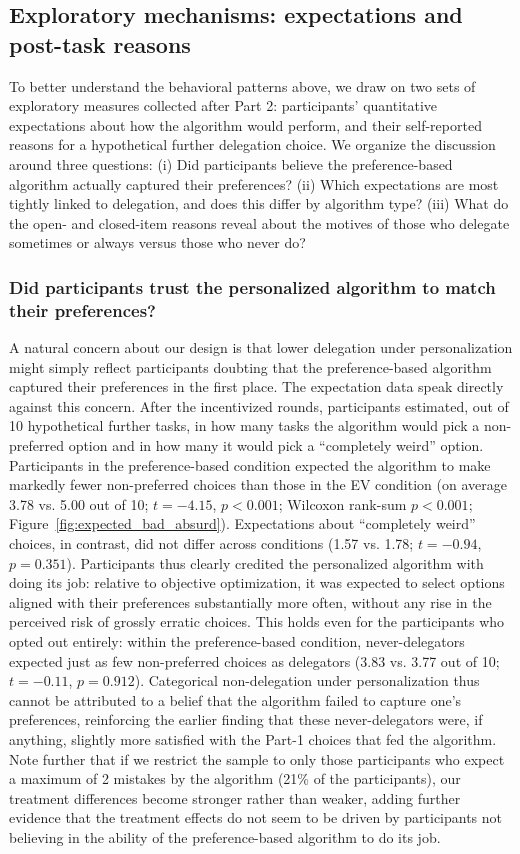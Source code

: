 \documentclass[a4paper, 12pt, fleqn]{article}
\theoremstyle{definition}
\begin{document}
\subsection{Exploratory mechanisms: expectations and post-task reasons}
\label{sec:exploratory_mechanisms}
To better understand the behavioral patterns above, we draw on two sets of exploratory measures collected after Part 2: participants' quantitative expectations about how the algorithm would perform, and their self-reported reasons for a hypothetical further delegation choice. We organize the discussion around three questions: (i) Did participants believe the preference-based algorithm actually captured their preferences? (ii) Which expectations are most tightly linked to delegation, and does this differ by algorithm type? (iii) What do the open- and closed-item reasons reveal about the motives of those who delegate sometimes or always versus those who never do?

\subsubsection*{Did participants trust the personalized algorithm to match their preferences?}
A natural concern about our design is that lower delegation under personalization might simply reflect participants doubting that the preference-based algorithm captured their preferences in the first place. The expectation data speak directly against this concern. After the incentivized rounds, participants estimated, out of 10 hypothetical further tasks, in how many tasks the algorithm would pick a non-preferred option and in how many it would pick a ``completely weird'' option. Participants in the preference-based condition expected the algorithm to make markedly fewer non-preferred choices than those in the EV condition (on average 3.78 vs. 5.00 out of 10; $t = -4.15$, $p < 0.001$; Wilcoxon rank-sum $p < 0.001$; Figure~\ref{fig:expected_bad_absurd}). Expectations about ``completely weird'' choices, in contrast, did not differ across conditions (1.57 vs. 1.78; $t = -0.94$, $p = 0.351$). Participants thus clearly credited the personalized algorithm with doing its job: relative to objective optimization, it was expected to select options aligned with their preferences substantially more often, without any rise in the perceived risk of grossly erratic choices. This holds even for the participants who opted out entirely: within the preference-based condition, never-delegators expected just as few non-preferred choices as delegators (3.83 vs. 3.77 out of 10; $t = -0.11$, $p = 0.912$). Categorical non-delegation under personalization thus cannot be attributed to a belief that the algorithm failed to capture one's preferences, reinforcing the earlier finding that these never-delegators were, if anything, slightly more satisfied with the Part-1 choices that fed the algorithm. Note further that if we restrict the sample to only those participants who expect a maximum of 2 mistakes by the algorithm (21\% of the participants), our treatment differences become stronger rather than weaker, adding further evidence that the treatment effects do not seem to be driven by participants not believing in the ability of the preference-based algorithm to do its job.
\end{document}
